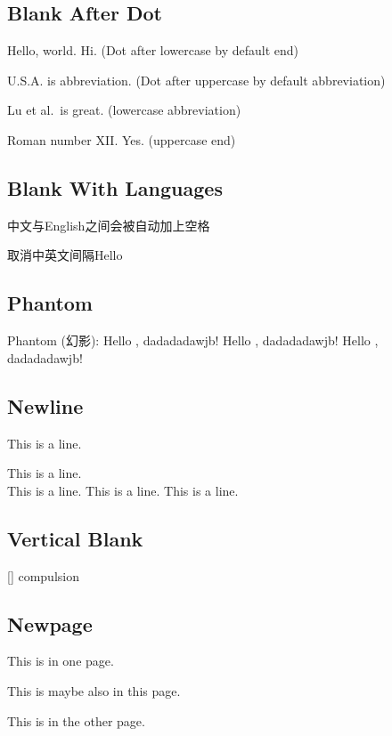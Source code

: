\subsection{Blank After Dot}
Hello, world. Hi. (Dot after lowercase by default end)

U.S.A. is abbreviation. (Dot after uppercase by default abbreviation)

Lu et al.\ is great. (lowercase abbreviation)

Roman number XII\@. Yes. (uppercase end)

\subsection{Blank With Languages}
中文与English之间会被自动加上空格

\mbox{取消中英文间隔}Hello

\subsection{Phantom}
Phantom (幻影): \newline
Hello \phantom{world}, dadadadawjb!     \newline    %
Hello \hphantom{world}, dadadadawjb!    \newline    %
Hello \vphantom{world}, dadadadawjb!                %

\subsection{Newline}
This is a line. \par
This is a line. \\[2cm]{}
This is a line. \linebreak[0]
This is a line. \newline
This is a line.

\subsection{Vertical Blank}
[\vspace{1cm plus 0.5cm minus 0.25cm}]              \newline    %
[\smallskip]                                        \newline    %
[\medskip]                                          \newline    %
[\bigskip]                                          \newline    %
\vspace*{1cm}compulsion                             \newline    %

\subsection{Newpage}
This is in one page. \enlargethispage*{1cm}     %

\pagebreak[0]
This is maybe also in this page.

\newpage
This is in the other page.

